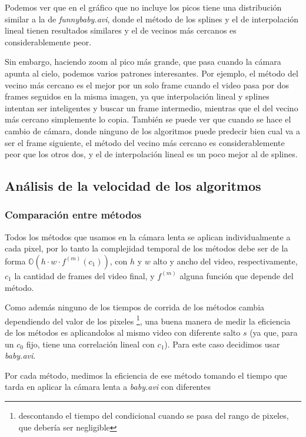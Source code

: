 Podemos ver que en el gr\'afico que no incluye los picos tiene una
distribuci\'on similar a la de \textit{funnybaby.avi}, donde el m\'etodo de los
splines y el de interpolaci\'on lineal tienen resultados similares y el de
vecinos m\'as cercanos es considerablemente peor.

Sin embargo, haciendo zoom al pico m\'as grande, que pasa cuando la c\'amara
apunta al cielo, podemos varios patrones interesantes. Por ejemplo, el m\'etodo del
vecino m\'as cercano es el mejor por un solo frame cuando el video pasa por dos
frames seguidos en la misma imagen, ya que interpolaci\'on lineal y splines
intentan ser inteligentes y buscar un frame intermedio, mientras que el del
vecino m\'as cercano simplemente lo copia. Tambi\'en se puede ver que cuando se
hace el cambio de c\'amara, donde ninguno de los algoritmos puede predecir bien
cual va a ser el frame siguiente, el m\'etodo del vecino m\'as cercano es
considerablemente peor que los otros dos, y el de interpolaci\'on lineal es un
poco mejor al de splines.

\subsection{An\'alisis de la velocidad de los algoritmos}

\subsubsection{Comparaci\'on entre m\'etodos}

Todos los m\'etodos que usamos en la c\'amara lenta se aplican individualmente a
cada pixel, por lo tanto la complejidad temporal de los m\'etodos debe ser de la
forma $ \mathbb{O}(h \cdot w \cdot f^{(m)}(c_1)) $, con $h$ y $w$ alto y ancho del
video, respectivamente, $c_1$ la cantidad de frames del video final, y $f^{(m)}$
alguna funci\'on que depende del m\'etodo.

Como adem\'as ninguno de los tiempos de corrida de los m\'etodos cambia
dependiendo del valor de los pixeles \footnote{descontando el tiempo del
condicional cuando se pasa del rango de pixeles, que deber\'ia ser negligible},
una buena manera de medir la eficiencia de los m\'etodos es aplicandolos al
mismo video con diferente salto $s$ (ya que, para un $c_0$ fijo, tiene una
correlaci\'on lineal con $c_1$). Para este caso decidimos usar
\textit{baby.avi}.

Por cada m\'etodo, medimos la eficiencia de ese m\'etodo tomando el tiempo que
tarda en aplicar la c\'amara lenta a \textit{baby.avi} con diferentes 

